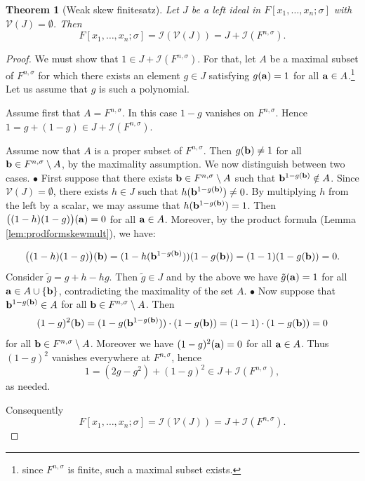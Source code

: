 \documentclass[11pt,reqno]{amsart}
\newtheorem{thm}{Theorem}[section]
\theoremstyle{definition}
\begin{document}
\begin{thm}[Weak skew finitesatz]\label{thm:skewfinsatz} 
Let $J$ be a left ideal in $F[x_1,\ldots,x_n;\sigma]$ with $\mathscr{V}(J) = \emptyset$. Then 
$$F[x_1,\dots,x_n;\sigma]=\mathscr{I}(\mathscr{V}(J))=J+\mathscr{I}(F^{n,\sigma}).$$ 
\end{thm} 
\begin{proof} We must show that $1 \in J+\mathscr{I}(F^{n,\sigma})$. For that, let $A$ be a maximal subset of $F^{n,\sigma}$ for which there exists an element $g \in J$ satisfying $g({\bf a}) = 1$ for all ${\bf a} \in A$.\footnote{since $F^{n,\sigma}$ is finite, such a maximal subset exists.} Let us assume that $g$ is such a polynomial. 

Assume first that $A = F^{n,\sigma}$. In this case $1-g$ vanishes on $F^{n,\sigma}$. Hence $1 = g+(1-g) \in J+\mathscr{I}(F^{n,\sigma})$.

Assume now that $A$ is a proper subset of $F^{n,\sigma}$. Then $g({\bf b}) \neq 1$ for all ${\bf b}  \in F^{n,\sigma}\setminus A$, by the maximality assumption. We now distinguish between two cases.
\vskip 1mm
\noindent
$\bullet$ First suppose that there exists ${\bf b}  \in F^{n,\sigma}\setminus A$ such that ${\bf b}^{1-g({\bf b})} \notin A$. Since $\mathscr{V}(J) = \emptyset$, there exists $h \in J$ such that $h({\bf b}^{1-g({\bf b})}) \neq 0$. By multiplying $h$ from the left by a scalar, we may assume that $h({\bf b}^{1-g({\bf b})})=1$. Then $\big((1-h)(1-g)\big)({\bf a}) = 0$ for all ${\bf a} \in A$. Moreover, by the product formula (Lemma \ref{lem:prodformskewmult}), we have:

$$\big((1-h)(1-g)\big)({\bf b}) = (1-h({\bf b}^{1-g({\bf b})}))(1-g({\bf b})) = (1-1)(1-g({\bf b}))= 0.$$
Consider $\tilde{g} = g+h-hg$. Then $\tilde{g} \in J$ and by the above we have $\tilde{g}({\bf a})=1$ for all ${\bf a} \in A \cup \{{\bf b}\}$, contradicting the maximality of the set $A$. 
\vskip 1mm
\noindent
$\bullet$ Now suppose that ${\bf b}^{1-g({\bf b})} \in A$ for all ${\bf b}  \in F^{n,\sigma}\setminus A$. Then $$(1-g)^2({\bf b}) = (1-g({\bf b}^{1-g({\bf b})})) \cdot (1-g({\bf b})) =(1-1) \cdot (1-g({\bf b})) = 0$$
for all ${\bf b}  \in F^{n,\sigma}\setminus A$. Moreover we have $(1-g)^2({\bf a}) = 0$ for all ${\bf a} \in A$. Thus $(1-g)^2$ vanishes everywhere at $F^{n,\sigma}$, hence $$1 = (2g-g^2)+(1-g)^2\in J+ \mathscr{I}(F^{n,\sigma}),$$
as needed. 

Consequently $$F[x_1,\dots,x_n;\sigma]=\mathscr{I}(\mathscr{V}(J))=J+\mathscr{I}(F^{n,\sigma}).$$ 
\end{proof}
\end{document}
